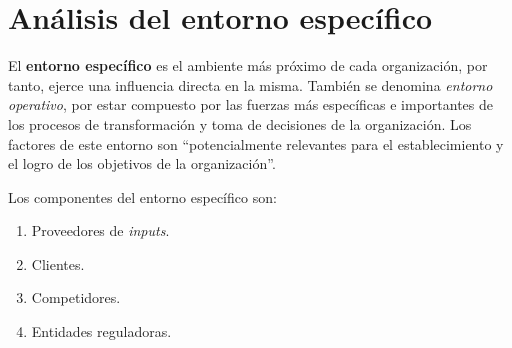 \documentclass[10pt,a4paper,spanish]{report}
\begin{document}
      \section{\textcolor[rgb]{0.3,0.4,0.6}Análisis del entorno específico}

            El \textbf{entorno específico} es el ambiente más próximo de cada organización, por tanto, ejerce una influencia directa en la misma. También se denomina \textit{\textcolor[rgb]{0.3,0.4,0.6}{entorno operativo}}, por estar compuesto por las fuerzas más específicas e importantes de los procesos de transformación y toma de decisiones de la organización. Los factores de este entorno son ``potencialmente relevantes para el establecimiento y el logro de los objetivos de la organización''.

            Los componentes del entorno específico son:
            \begin{enumerate}
                  \item Proveedores de \textit{\textcolor[rgb]{0.3,0.4,0.6}{inputs}}.
                  \item Clientes.
                  \item Competidores.
                  \item Entidades reguladoras.
            \end{enumerate}
\end{document}
